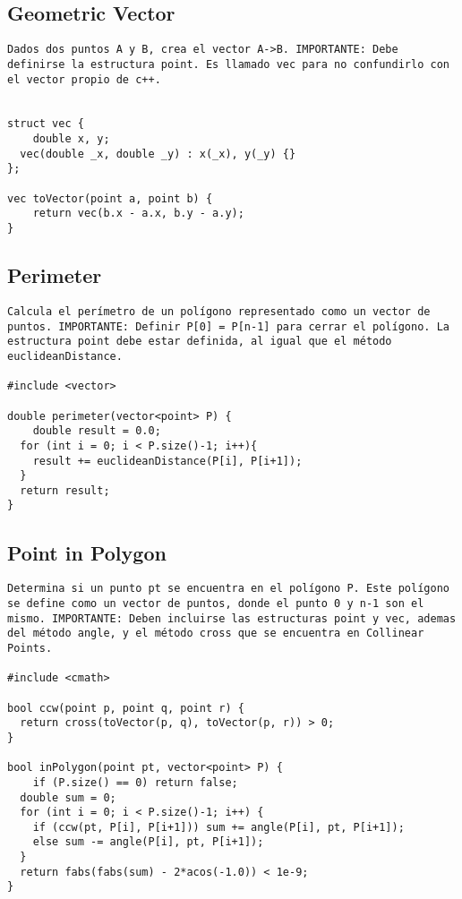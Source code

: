\documentclass[10pt,letterpaper,twocolumn,twosided]{article}
\begin{document}
\subsection{Geometric Vector}
\begin{lstlisting}
Dados dos puntos A y B, crea el vector A->B. IMPORTANTE: Debe definirse la estructura point. Es llamado vec para no confundirlo con el vector propio de c++.


struct vec { 
	double x, y;  
  vec(double _x, double _y) : x(_x), y(_y) {} 
};

vec toVector(point a, point b) {       
	return vec(b.x - a.x, b.y - a.y); 
}
\end{lstlisting}

\subsection{Perimeter}
\begin{lstlisting}
Calcula el perímetro de un polígono representado como un vector de puntos. IMPORTANTE: Definir P[0] = P[n-1] para cerrar el polígono. La estructura point debe estar definida, al igual que el método euclideanDistance.

#include <vector>

double perimeter(vector<point> P) {
	double result = 0.0;
  for (int i = 0; i < P.size()-1; i++){
  	result += euclideanDistance(P[i], P[i+1]);
  }
  return result; 
}

\end{lstlisting}

\subsection{Point in Polygon}
\begin{lstlisting}
Determina si un punto pt se encuentra en el polígono P. Este polígono se define como un vector de puntos, donde el punto 0 y n-1 son el mismo. IMPORTANTE: Deben incluirse las estructuras point y vec, ademas del método angle, y el método cross que se encuentra en Collinear Points.

#include <cmath>

bool ccw(point p, point q, point r) {
  return cross(toVector(p, q), toVector(p, r)) > 0; 
}
  
bool inPolygon(point pt, vector<point> P) {
	if (P.size() == 0) return false; 
  double sum = 0;    
  for (int i = 0; i < P.size()-1; i++) {
    if (ccw(pt, P[i], P[i+1])) sum += angle(P[i], pt, P[i+1]); 
    else sum -= angle(P[i], pt, P[i+1]);
  }
  return fabs(fabs(sum) - 2*acos(-1.0)) < 1e-9; 
}
\end{lstlisting}
\end{document}

